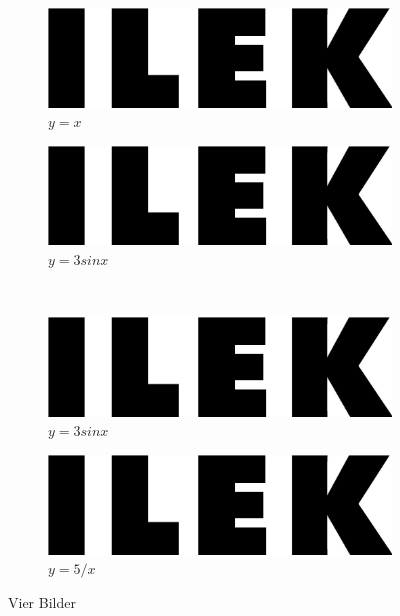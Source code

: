 \blindtext

\begin{figure}[H]
	\centering
	\begin{subfigure}[b]{0.3\textwidth}
		\centering
		\includegraphics[width=\textwidth]{Images/ILEK-logo.jpg}
		\caption{$y=x$}
		\label{fig:a}
	\end{subfigure}
\hspace{1cm}
	\begin{subfigure}[b]{0.3\textwidth}
		\centering
		\includegraphics[width=\textwidth]{Images/ILEK-logo.jpg}
		\caption{$y=3sinx$}
		\label{fig:b}
	\end{subfigure}
	\\ 
	\begin{subfigure}[b]{0.3\textwidth}
		\centering
		\includegraphics[width=\textwidth]{Images/ILEK-logo.jpg}
		\caption{$y=3sinx$}
		\label{fig:c}
	\end{subfigure}
\hspace{1cm}
	\begin{subfigure}[b]{0.3\textwidth}
		\centering
		\includegraphics[width=\textwidth]{Images/ILEK-logo.jpg}
		\caption{$y=5/x$}
		\label{fig:five over x}
	\end{subfigure}
	\caption{Vier Bilder}
	\label{fig:d}
\end{figure}



